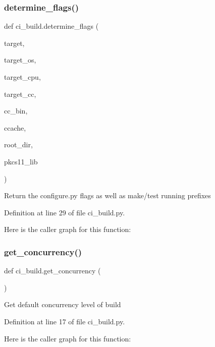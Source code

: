 \subsubsection{\texorpdfstring{determine\+\_\+flags()}{determine\_flags()}}
{\footnotesize\ttfamily def ci\+\_\+build.\+determine\+\_\+flags (\begin{DoxyParamCaption}\item[{}]{target,  }\item[{}]{target\+\_\+os,  }\item[{}]{target\+\_\+cpu,  }\item[{}]{target\+\_\+cc,  }\item[{}]{cc\+\_\+bin,  }\item[{}]{ccache,  }\item[{}]{root\+\_\+dir,  }\item[{}]{pkcs11\+\_\+lib }\end{DoxyParamCaption})}

\begin{DoxyVerb}Return the configure.py flags as well as make/test running prefixes
\end{DoxyVerb}
 

Definition at line 29 of file ci\+\_\+build.\+py.

Here is the caller graph for this function\+:
\mbox{\label{namespaceci__build_a81557509babcdd915f3d788bbec4b682}} 
\subsubsection{\texorpdfstring{get\+\_\+concurrency()}{get\_concurrency()}}
{\footnotesize\ttfamily def ci\+\_\+build.\+get\+\_\+concurrency (\begin{DoxyParamCaption}{ }\end{DoxyParamCaption})}

\begin{DoxyVerb}Get default concurrency level of build
\end{DoxyVerb}
 

Definition at line 17 of file ci\+\_\+build.\+py.

Here is the caller graph for this function\+:
\mbox{\label{namespaceci__build_ac75d86cb2f5840433b6c90ced39febc1}} 
